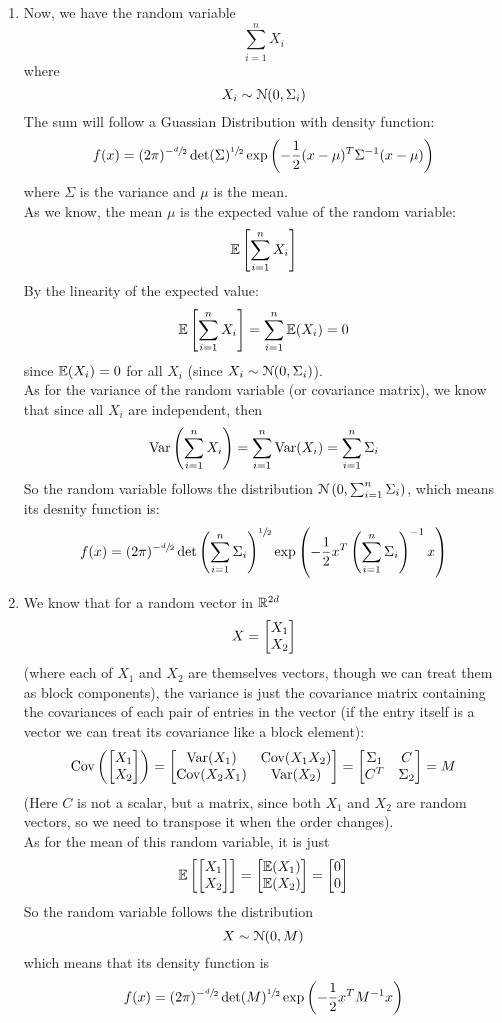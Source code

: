 \documentclass[12pt]{article}
\begin{document}
    \begin{enumerate}[label=\alph*)]
        \item 
        Now, we have the random variable
        \[ \sum_{i = 1}^{n} X_i \]
        where 
        \[ X_i \sim \mathcal{N}(0, \Sigma_i) \]
        The sum will follow a Guassian Distribution
        with density function:
        \[ f(x) = (2\pi)^{-\sfrac{d}{2}}
        \det(\Sigma)^{\sfrac{1}{2}}
        \exp\left( -\dfrac{1}{2}(x-\mu)^T
        \Sigma^{-1} (x - \mu) \right) \]
        where $\Sigma$ is the variance
        and $\mu$ is the mean. \\
        As we know, the mean $\mu$
        is the expected value of the
        random variable:
        \[ \mathbb{E}\left[ \sum_{i = 1}^{n} X_i \right] \]
        By the linearity of the expected value:
        \[ \mathbb{E}\left[ \sum_{i = 1}^{n} X_i \right] =
        \sum_{i = 1}^{n} \mathbb{E}(X_i) = 0 \]
        since $\mathbb{E}(X_i) = 0$ for all $X_i$
        (since $X_i \sim \mathcal{N}(0, \Sigma_i)$). \\
        As for the variance of the random
        variable (or covariance matrix),
        we know that since all $X_i$
        are independent,
        then 
        \[ \text{Var}\left( \sum_{i=1}^{n}X_i \right) = 
        \sum_{i=1}^{n} \text{Var}(X_i)
        = \sum_{i=1}^{n} \Sigma_i \]
        So the random variable follows
        the distribution 
        $\mathcal{N}\left( 0, \sum_{i=1}^{n} \Sigma_i \right)$,
        which means its desnity function is:
         \[ f(x) = (2\pi)^{-\sfrac{d}{2}}
        \det\left( \sum_{i=1}^{n} \Sigma_i \right)^{\sfrac{1}{2}}
        \exp\left( -\dfrac{1}{2}x^T
        \left( \sum_{i=1}^{n} \Sigma_i \right)^{-1} x \right) \]
        \item 
        We know that for a random vector
        in $\mathbb{R}^{2d}$
        \[ X = \begin{bmatrix} X_1 \\ X_2 \end{bmatrix} \]
        (where each of $X_1$ and $X_2$
        are themselves vectors, though we
        can treat them as block components),
        the variance is just
        the covariance matrix
        containing the covariances of each
        pair of entries in the vector
        (if the entry itself is a vector
        we can treat its covariance like 
        a block element):
        \[ \text{Cov}\left( \begin{bmatrix} X_1 \\ X_2 \end{bmatrix} \right)
        = \begin{bmatrix} \text{Var}(X_1) & \text{Cov}(X_1X_2) \\ \text{Cov}(X_2X_1) & \text{Var}(X_2) \end{bmatrix} 
        = \begin{bmatrix} \Sigma_1 & C \\ C^{T} & \Sigma_2 \end{bmatrix} = M \]
        (Here $C$ is not a scalar,
        but a matrix, since both $X_1$
        and $X_2$ are random vectors,
        so we need to transpose it when the order
        changes). \\
        As for the mean of this random variable,
        it is just 
        \[ \mathbb{E}\left[  \begin{bmatrix} X_1 \\ X_2 \end{bmatrix} \right]
        = \begin{bmatrix} \mathbb{E}(X_1) \\ \mathbb{E}(X_2) \end{bmatrix}
        = \begin{bmatrix} 0 \\ 0 \end{bmatrix} \]
        So the random variable follows the
        distribution
        \[ X \sim \mathcal{N}(0, M) \]
        which means that its density function is
        \[ f(x) = (2\pi)^{-\sfrac{d}{2}}
        \det(M)^{\sfrac{1}{2}}
        \exp\left( -\dfrac{1}{2}x^T
        M^{-1} x \right) \]
    \end{enumerate}
\end{document}
